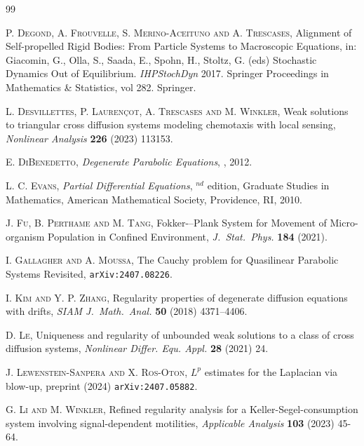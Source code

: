 \documentclass[11pt,a4paper,reqno]{amsart}
\theoremstyle{remark}
\theoremstyle{definition}
\numberwithin{equation}{section}
\begin{document}
\begin{thebibliography}{99}
\begin{footnotesize}
\newblock \textsc{P. Degond, A. Frouvelle, S. Merino-Aceituno and A. Trescases},
\newblock Alignment of Self-propelled Rigid Bodies: From Particle Systems to Macroscopic Equations, 
\newblock in: Giacomin, G., Olla, S., Saada, E., Spohn, H., Stoltz, G. (eds) Stochastic Dynamics Out of Equilibrium. \textit{IHPStochDyn} 2017. Springer Proceedings in Mathematics \& Statistics, vol 282. Springer.

\newblock \textsc{L. Desvillettes, P. Lauren\c{c}ot, A. Trescases and M. Winkler},
\newblock Weak solutions to triangular cross diffusion systems modeling
chemotaxis with local sensing, 
\newblock \textit{Nonlinear Analysis} \textbf{226} (2023) 113153.


    \newblock \textsc{E. DiBenedetto},
    \newblock \textit{Degenerate Parabolic Equations}, 
    , 2012. 

    \newblock \textsc{L. C. Evans},
    \newblock \textit{Partial Differential Equations}, 
    $^{nd}$ edition, Graduate Studies in Mathematics, American Mathematical Society, Providence, RI, 2010. 

    \newblock \textsc{J. Fu, B. Perthame and M. Tang},
    \newblock Fokker-–Plank System for Movement of Micro-organism Population in Confined Environment, 
    \newblock \textit{J.~Stat.~Phys.} \textbf{184} (2021).




\newblock \textsc{I. Gallagher and A. Moussa},
\newblock The Cauchy problem for Quasilinear Parabolic Systems Revisited, 
\newblock \texttt{arXiv:2407.08226}.

    \newblock \textsc{I. Kim and Y. P. Zhang},
    \newblock Regularity properties of degenerate diffusion equations with drifts, 
    \newblock \textit{SIAM J.~Math.~Anal.} \textbf{50} (2018) 4371–4406. 

\newblock \textsc{D. Le},
\newblock Uniqueness and regularity of unbounded weak solutions to a class of cross diffusion systems, 
\newblock \textit{Nonlinear Differ. Equ. Appl.} \textbf{28} (2021) 24.


\newblock \textsc{J. Lewenstein-Sanpera and X. Ros-Oton},
\newblock $L^p$ estimates for the Laplacian via blow-up, 
\newblock preprint (2024) \texttt{arXiv:2407.05882}. 

\newblock \textsc{G. Li and M. Winkler},
\newblock Refined regularity analysis for a Keller-Segel-consumption system involving signal-dependent motilities, 
\newblock \textit{Applicable Analysis} \textbf{103} (2023) 45-64.


\end{footnotesize}
\end{thebibliography}
\end{document}
